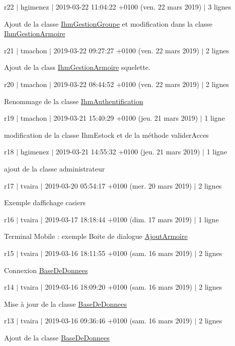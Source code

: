 r22 $\vert$ hgimenez $\vert$ 2019-\/03-\/22 11\+:04\+:22 +0100 (ven. 22 mars 2019) $\vert$ 3 lignes

Ajout de la classe \hyperlink{class_ihm_gestion_groupe}{Ihm\+Gestion\+Groupe} et modification dans la classe \hyperlink{class_ihm_gestion_armoire}{Ihm\+Gestion\+Armoire}

r21 $\vert$ tmachon $\vert$ 2019-\/03-\/22 09\+:27\+:27 +0100 (ven. 22 mars 2019) $\vert$ 2 lignes

Ajout de la class \hyperlink{class_ihm_gestion_armoire}{Ihm\+Gestion\+Armoire} squelette.

r20 $\vert$ tmachon $\vert$ 2019-\/03-\/22 08\+:44\+:52 +0100 (ven. 22 mars 2019) $\vert$ 2 lignes

Renommage de la classe \hyperlink{class_ihm_authentification}{Ihm\+Authentification}

r19 $\vert$ tmachon $\vert$ 2019-\/03-\/21 15\+:40\+:29 +0100 (jeu. 21 mars 2019) $\vert$ 1 ligne

modification de la classe Ihm\+Estock et de la méthode valider\+Acces

r18 $\vert$ hgimenez $\vert$ 2019-\/03-\/21 14\+:55\+:32 +0100 (jeu. 21 mars 2019) $\vert$ 1 ligne

ajout de la classe administrateur

r17 $\vert$ tvaira $\vert$ 2019-\/03-\/20 05\+:54\+:17 +0100 (mer. 20 mars 2019) $\vert$ 2 lignes

Exemple d\textquotesingle{}affichage casiers

r16 $\vert$ tvaira $\vert$ 2019-\/03-\/17 18\+:18\+:44 +0100 (dim. 17 mars 2019) $\vert$ 1 ligne

Terminal Mobile \+: exemple Boite de dialogue \hyperlink{class_ajout_armoire}{Ajout\+Armoire}

r15 $\vert$ tvaira $\vert$ 2019-\/03-\/16 18\+:11\+:55 +0100 (sam. 16 mars 2019) $\vert$ 2 lignes

Connexion \hyperlink{class_base_de_donnees}{Base\+De\+Donnees}

r14 $\vert$ tvaira $\vert$ 2019-\/03-\/16 18\+:09\+:20 +0100 (sam. 16 mars 2019) $\vert$ 2 lignes

Mise à jour de la classe \hyperlink{class_base_de_donnees}{Base\+De\+Donnees}

r13 $\vert$ tvaira $\vert$ 2019-\/03-\/16 09\+:36\+:46 +0100 (sam. 16 mars 2019) $\vert$ 2 lignes

Ajout de la classe \hyperlink{class_base_de_donnees}{Base\+De\+Donnees}

